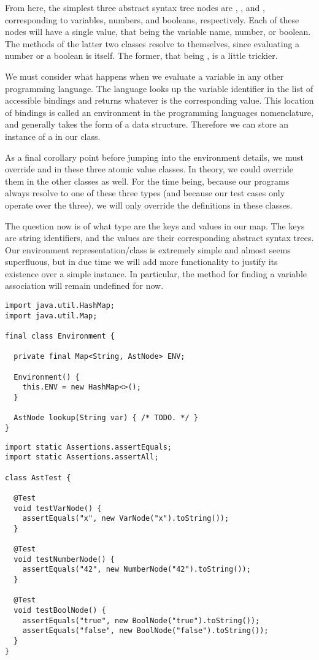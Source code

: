 From here, the simplest three abstract syntax tree nodes are , , and , corresponding to variables, numbers, and booleans, respectively. Each of these nodes will have a single value, that being the variable name, number, or boolean. The  methods of the latter two classes resolve to themselves, since evaluating a number or a boolean is itself. The former, that being , is a little trickier. 

We must consider what happens when we evaluate a variable in any other programming language. The language looks up the variable identifier in the list of accessible bindings and returns whatever is the corresponding value. This location of bindings is called an environment in the programming languages nomenclature, and generally takes the form of a  data structure. Therefore we can store an instance of a  in our  class. 

As a final corollary point before jumping into the environment details, we must override  and  in these three atomic value classes. In theory, we could override them in the other classes as well. For the time being, because our programs always resolve to one of these three types (and because our test cases only operate over the three), we will only override the definitions in these classes.

The question now is of what type are the keys and values in our map. The keys are string identifiers, and the values are their corresponding abstract syntax trees. Our environment representation/class is extremely simple and almost seems superfluous, but in due time we will add more functionality to justify its existence over a simple  instance. In particular, the  method for finding a variable association will remain undefined for now.

\begin{lstlisting}[language=MyJava]
import java.util.HashMap;
import java.util.Map;

final class Environment {
  
  private final Map<String, AstNode> ENV;

  Environment() { 
    this.ENV = new HashMap<>(); 
  }

  AstNode lookup(String var) { /* TODO. */ }
}
\end{lstlisting}

\begin{lstlisting}[language=MyJava]
import static Assertions.assertEquals;
import static Assertions.assertAll;

class AstTest {

  @Test
  void testVarNode() {
    assertEquals("x", new VarNode("x").toString());
  }

  @Test
  void testNumberNode() {
    assertEquals("42", new NumberNode("42").toString());
  }

  @Test
  void testBoolNode() {
    assertEquals("true", new BoolNode("true").toString());
    assertEquals("false", new BoolNode("false").toString());
  }  
}
\end{lstlisting}

